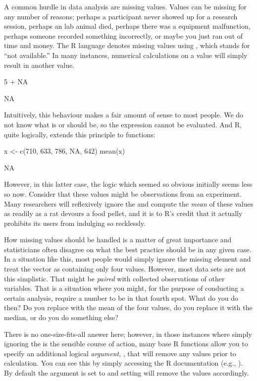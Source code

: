 A common hurdle in data analysis are missing values.  Values can be missing for any number of reasons; perhaps a participant never showed up for a research session, perhaps an lab animal died, perhaps there was a equipment malfunction, perhaps someone recorded something incorrectly, or maybe you just ran out of time and money. The R language denotes missing values using , which stands for ``not available.'' In many instances, numerical calculations on a  value will simply result in another  value.

\begin{inR}
5 + NA
\end{inR}
\begin{outR}
[1] NA
\end{outR}

Intuitively, this behaviour makes a fair amount of sense to most people.  We do not know what  is or should be, so the expression  cannot be evaluated. And R, quite logically, extends this principle to functions:

\begin{inR}
x <- c(710, 633, 786, NA, 642)
mean(x)
\end{inR}
\begin{outR}
[1] NA
\end{outR}

However, in this latter case, the logic which seemed so obvious initially seems less so now.  Consider that these values might be observations from an experiment.  Many researchers will reflexively ignore the  and compute the \textit{mean} of these values as readily as a rat devours a food pellet, and it is to R's credit that it actually prohibits its users from indulging so recklessly.

How missing values should be handled is a matter of great importance and statisticians often disagree on what the best practice should be in any given case. In a situation like this, most people would simply ignore the missing element and treat the vector as containing only four values. However, most data sets are not this simplistic.  That  might be \textit{paired} with collected observations of other variables. That is a situation where you might, for the purpose of conducting a certain analysis, require a number to be in that fourth spot. What do you do then? Do you replace  with the mean of the four values, do you replace it with the median, or do you do something else?

There is no one-size-fits-all answer here; however, in those instances where simply ignoring the  is the sensible course of action, many base R functions allow you to specify an additional logical \textit{argument}, , that will remove any  values prior to calculation. You can see this by simply accessing the R documentation (e.g., ). By default the argument is set to  and setting  will remove the  values accordingly.

